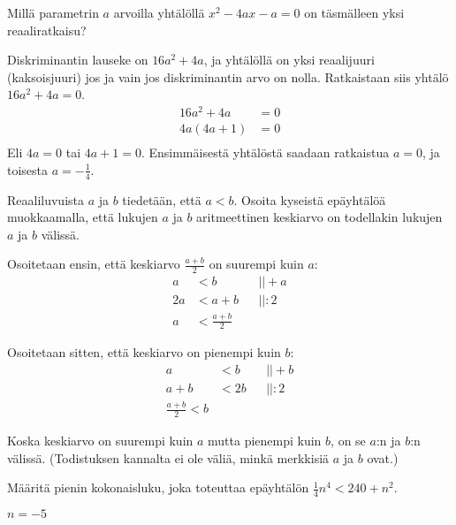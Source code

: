 \begin{tehtava}
Millä parametrin $a$ arvoilla yhtälöllä $x^2-4ax-a=0$ on täsmälleen yksi reaaliratkaisu?
	\begin{vastaus}
	Diskriminantin lauseke on $16a^2+4a$, ja yhtälöllä on yksi reaalijuuri (kaksoisjuuri) jos ja vain jos diskriminantin arvo on nolla. Ratkaistaan siis yhtälö $16a^2+4a=0$.
	\begin{align*}
	16a^2+4a&=0 \\
	4a(4a+1)&=0 \\
	\end{align*}
	Eli $4a=0$ tai $4a+1=0$. Ensimmäisestä yhtälöstä saadaan ratkaistua $a=0$, ja toisesta $a=-\frac{1}{4}$.
	\end{vastaus}
\end{tehtava}

\begin{tehtava}
Reaaliluvuista $a$ ja $b$ tiedetään, että $a<b$. Osoita kyseistä epäyhtälöä muokkaamalla, että lukujen $a$ ja $b$ aritmeettinen keskiarvo on todellakin lukujen $a$ ja $b$ välissä.
	\begin{vastaus}
	Osoitetaan ensin, että keskiarvo $\frac{a+b}{2}$ on suurempi kuin $a$:
	\begin{align*}
	a&<b && ||+a \\
	2a&<a+b && ||:2 \\
	a&<\frac{a+b}{2} && 
	\end{align*}
	
	Osoitetaan sitten, että keskiarvo on pienempi kuin $b$:
	\begin{align*}
	a&<b && ||+b \\
	a+b&<2b && ||:2 \\
	\frac{a+b}{2}<b &&
	\end{align*}
	
	Koska keskiarvo on suurempi kuin $a$ mutta pienempi kuin $b$, on se $a$:n ja $b$:n välissä. (Todistuksen kannalta ei ole väliä, minkä merkkisiä $a$ ja $b$ ovat.) 
	\end{vastaus}
\end{tehtava}

\begin{tehtava}
Määritä pienin kokonaisluku, joka toteuttaa epäyhtälön $\frac{1}{4}n^4<240+n^2$.
	\begin{vastaus}
	$n=-5$
	\end{vastaus}
\end{tehtava}

